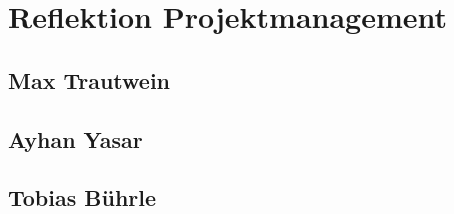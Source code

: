 \chapter{Reflektion Projektmanagement}\label{ch:reflektion-projektmanagement}


\section{Max Trautwein}


\section{Ayhan Yasar}


\section{Tobias Bührle}

